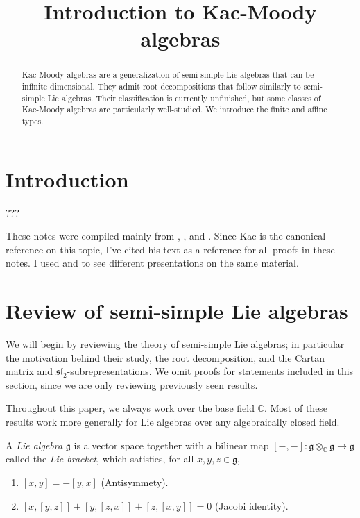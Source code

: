\documentclass[11pt, letterpaper]{article}
\title{Introduction to Kac-Moody algebras}
\theoremstyle{plain}
\begin{document}
\makereport

\begin{abstract}
	Kac-Moody algebras are a generalization of semi-simple Lie algebras that can be infinite dimensional. They admit root decompositions that follow similarly to semi-simple Lie algebras. Their classification is currently unfinished, but some classes of Kac-Moody algebras are particularly well-studied. We introduce the finite and affine types.
\end{abstract}

\section{Introduction}

???

These notes were compiled mainly from \cite{kac}, \cite{carter}, and \cite{???}. Since Kac is the canonical reference on this topic, I've cited his text as a reference for all proofs in these notes. I used \cite{carter} and \cite{???} to see different presentations on the same material.

\section{Review of semi-simple Lie algebras}

We will begin by reviewing the theory of semi-simple Lie algebras; in particular the motivation behind their study, the root decomposition, and the Cartan matrix and $\mathfrak{sl} _2$-subrepresentations. We omit proofs for statements included in this section, since we are only reviewing previously seen results.

Throughout this paper, we always work over the base field $\mathbb{C} $. Most of these results work more generally for Lie algebras over any algebraically closed field.

\begin{definition}\label{dfn:2-1}
	A \emph{Lie algebra} $\mathfrak{g} $ is a vector space together with a bilinear map $[-,-]: \mathfrak{g} \otimes_\mathbb{C} \mathfrak{g}  \to \mathfrak{g} $ called the \emph{Lie bracket}, which satisfies, for all $x,y,z\in \mathfrak{g} $,
	\begin{enumerate}[label=(\arabic*), align=right]
		\item $[x,y]=-[y,x]$ (Antisymmety).
		\item $[x,[y,z]] + [y,[z,x]] + [z,[x,y]]=0$ (Jacobi identity).
	\end{enumerate}
\end{definition}
\end{document}
